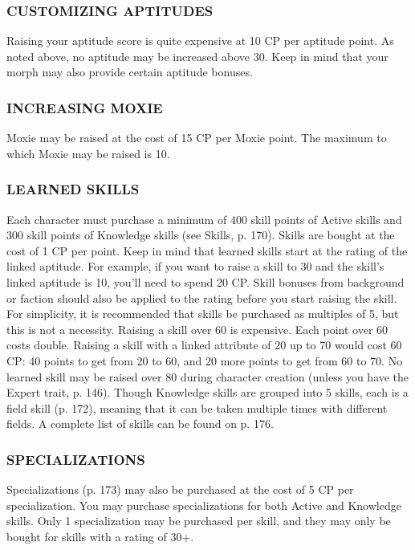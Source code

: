 \subsubsection{CUSTOMIZING APTITUDES} Raising your aptitude score is quite
expensive at 10 CP per aptitude point. As noted above, no aptitude may be
increased above 30. Keep in mind that your morph may also provide certain
aptitude bonuses.

\subsubsection{INCREASING MOXIE} Moxie may be raised at the cost of 15 CP per
Moxie point. The maximum to which Moxie may be raised is 10.  %

\subsubsection{LEARNED SKILLS} Each character must purchase a minimum of 400
skill points of Active skills and 300 skill points of Knowledge skills (see
Skills, p. 170). Skills are bought at the cost of 1 CP per point. Keep in mind
that learned skills start at the rating of the linked aptitude. For example, if
you want to raise a skill to 30 and the skill’s linked aptitude is 10, you’ll
need to spend 20 CP.  Skill bonuses from background or faction should also be
applied to the rating before you start raising the skill. For simplicity, it is
recommended that skills be purchased as multiples of 5, but this is not a
necessity.  Raising a skill over 60 is expensive. Each point over 60 costs
double. Raising a skill with a linked attribute of 20 up to 70 would cost 60
CP: 40 points to get from 20 to 60, and 20 more points to get from 60 to 70.
No learned skill may be raised over 80 during character creation (unless you
have the Expert trait, p. 146).  Though Knowledge skills are grouped into 5
skills, each is a field skill (p. 172), meaning that it can be taken multiple
times with different fields.  A complete list of skills can be found on p. 176.

\subsubsection{SPECIALIZATIONS} Specializations (p. 173) may also be purchased
at the cost of 5 CP per specialization. You may purchase specializations for
both Active and Knowledge skills.  Only 1 specialization may be purchased per
skill, and they may only be bought for skills with a rating of 30+.

